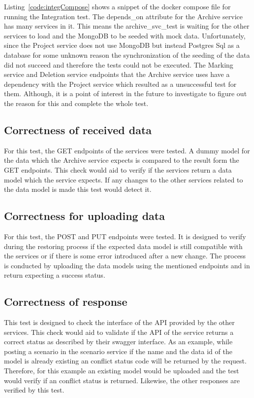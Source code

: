Listing~\ref{code:integCompose} shows a snippet of the docker compose file for running the Integration test. The depends\_on attribute for the Archive service
has many services in it. This means the archive\_svc\_test is waiting for the other services to load and the MongoDB to be seeded with mock data. Unfortunately,
since the Project service does not use MongoDB but instead Postgres Sql as a database for some unknown reason the synchronization of the seeding of the data
did not succeed and therefore the tests could not be executed. The
Marking service and Deletion service endpoints that the Archive service uses have a dependency with the Project service  which resulted as a unsuccessful test
for them. Although, it is a point of interest in the future to investigate to figure out the reason for this and complete the whole test.

\subsection{Correctness of received data}
For this test, the GET endpoints of the services were tested. A dummy model for the data which the Archive service expects is compared to the result
form the GET endpoints. This check would aid to verify if the services return a data model which the service expects. If any changes to the other services
related to the data model is made this test would detect it. 

\subsection{Correctness for uploading data}
For this test, the POST and PUT endpoints were tested. It is designed to verify during the restoring process if the expected data model 
is still compatible with the services or if there is some error introduced after a new change. The process is conducted by uploading the 
data models using the mentioned endpoints and in return expecting a success status.

\subsection{Correctness of response}
This test is designed to check the interface of the API provided by the other services. This check would aid to validate if the API of the
service returns a correct status as described by their swagger interface. As an example, while posting a scenario in the scenario service if the
name and the data id of the model is already existing an conflict status code will be returned by the request. Therefore, for this example an existing
model would be uploaded and the test would verify if an conflict status is returned. Likewise, the other responses are verified by this test. 

